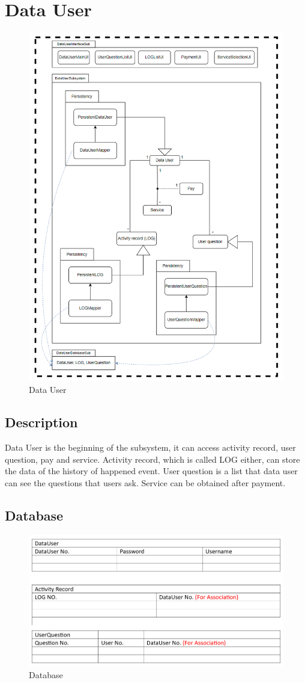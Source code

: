 \section{Data User}

\begin{figure}[H]
    \centering
    \includegraphics[width=0.75\linewidth]{picture/3-3/3-3-1.jpg}
    \caption{Data User}
    \label{fig:enter-label}
\end{figure}

\subsection{Description}

Data User is the beginning of the subsystem, it can access activity record, user question, pay and service. Activity record, which is called LOG either, can store the data of the history of happened event. User question is a list that data user can see the questions that users ask. Service can be obtained after payment.

\subsection{Database}
\begin{figure}[H]
    \centering
    \includegraphics[width=0.75\linewidth]{picture/3-3/3-3-2.jpg}
    \caption{Database}
    \label{fig:enter-label}
\end{figure}

